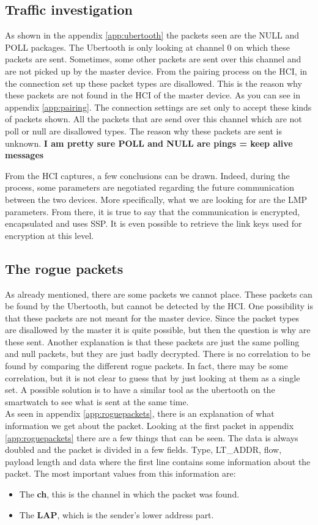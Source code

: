 \subsection{Traffic investigation}
As shown in the appendix \ref{app:ubertooth} the packets seen are the NULL and POLL packages. The Ubertooth is only looking at channel 0 on which these packets are sent. Sometimes, some other packets are sent over this channel and are not picked up by the master device. From the pairing process on the HCI, in the connection set up these packet types are disallowed. This is the reason why these packets are not found in the HCI of the master device. As you can see in appendix \ref{app:pairing}. The connection settings are set only to accept these kinds of packets shown. All the packets that are send over this channel which are not poll or null are disallowed types. \pend
The reason why these packets are sent is unknown. \textbf{I am pretty sure POLL and NULL are pings = keep alive messages}

From the HCI captures, a few conclusions can be drawn. Indeed, during the process, some parameters are negotiated regarding the future communication between the two devices. More specifically, what we are looking for are the LMP parameters. From there, it is true to say that the communication is encrypted, encapsulated and uses SSP. It is even possible to retrieve the link keys used for encryption at this level.

\subsection{The rogue packets}
As already mentioned, there are some packets we cannot place. These packets can be found by the Ubertooth, but cannot be detected by the HCI. One possibility is that these packets are not meant for the master device. Since the packet types are disallowed by the master it is quite possible, but then the question is why are these sent. Another explanation is that these packets are just the same polling and null packets, but they are just badly decrypted. There is no correlation to be found by comparing the different rogue packets. In fact, there may be some correlation, but it is not clear to guess that by just looking at them as a single set. A possible solution is to have a similar tool as the ubertooth on the smartwatch to see what is sent at the same time. \\
As seen in appendix \ref{app:roguepackets}, there is an explanation of what information we get about the packet.
Looking at the first packet in appendix \ref{app:roguepackets} there are a few things that can be seen. The data is always doubled and the packet is divided in a few fields. Type, LT\_ADDR, flow, payload length and data where the first line contains some information about the packet. The most important values from this information are:
\begin{itemize} 
\item The \textbf{ch}, this is the channel in which the packet was found.
\item The \textbf{LAP}, which is the sender's lower address part.
\end{itemize}
